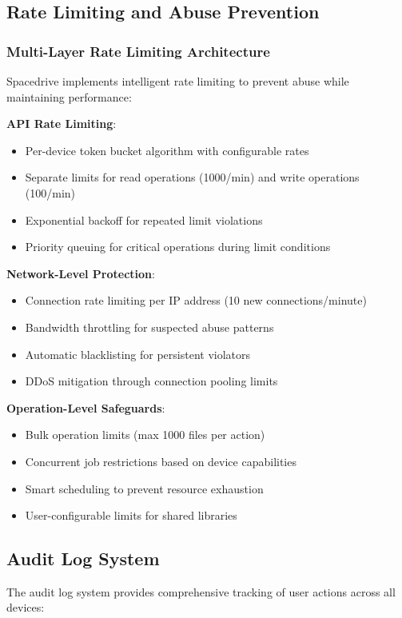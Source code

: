 \documentclass[sigconf]{acmart}
\begin{document}
\subsection{Rate Limiting and Abuse Prevention}
\subsubsection{Multi-Layer Rate Limiting Architecture}
Spacedrive implements intelligent rate limiting to prevent abuse while maintaining performance:

\textbf{API Rate Limiting}:
\begin{itemize}[noitemsep, topsep=0pt]
\item Per-device token bucket algorithm with configurable rates
\item Separate limits for read operations (1000/min) and write operations (100/min)
\item Exponential backoff for repeated limit violations
\item Priority queuing for critical operations during limit conditions
\end{itemize}

\textbf{Network-Level Protection}:
\begin{itemize}[noitemsep, topsep=0pt]
\item Connection rate limiting per IP address (10 new connections/minute)
\item Bandwidth throttling for suspected abuse patterns
\item Automatic blacklisting for persistent violators
\item DDoS mitigation through connection pooling limits
\end{itemize}

\textbf{Operation-Level Safeguards}:
\begin{itemize}[noitemsep, topsep=0pt]
\item Bulk operation limits (max 1000 files per action)
\item Concurrent job restrictions based on device capabilities
\item Smart scheduling to prevent resource exhaustion
\item User-configurable limits for shared libraries
\end{itemize}

\subsection{Audit Log System}
The audit log system provides comprehensive tracking of user actions across all devices:
\end{document}
